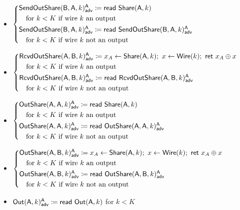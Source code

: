 \begin{itemize}
\item {\color{blue} $\begin{cases*} \LeakSendOutShare(\B,\A,k)^\A_\adv \coloneqq \read{\Share(\A,k)} \\ \hspace{10pt} \text{for $k < K$ if wire $k$ an output} \\ \LeakSendOutShare(\B,\A,k)^\A_\adv \coloneqq \read{\LeakSendOutShare(\B,\A,k)^\A_\adv} \\ \hspace{10pt} \text{for $k < K$ if wire $k$ not an output} \end{cases*}$}
\item {\color{blue} $\begin{cases*} \LeakRcvdOutShare(\A,\B,k)^\A_\adv \coloneqq x_A \leftarrow \Share(\A,k); \ x \leftarrow \Wire(k); \ \ret{x_A \oplus x} \\ \hspace{10pt} \text{for $k < K$ if wire $k$ an output} \\ \LeakRcvdOutShare(\A,\B,k)^\A_\adv \coloneqq \read{\LeakRcvdOutShare(\A,\B,k)^\A_\adv} \\ \hspace{10pt} \text{for $k < K$ if wire $k$ not an output} \end{cases*}$}
\item {\color{blue} $\begin{cases*} \LeakOutShare(\A,\A,k)^\A_\adv \coloneqq \read{\Share(\A,k)} \\ \hspace{10pt} \text{for $k < K$ if wire $k$ an output} \\ \LeakOutShare(\A,\A,k)^\A_\adv \coloneqq \read{\LeakOutShare(\A,\A,k)^\A_\adv} \\ \hspace{10pt} \text{for $k < K$ if wire $k$ not an output} \end{cases*}$}
\item {\color{blue} $\begin{cases*} \LeakOutShare(\A,\B,k)^\A_\adv \coloneqq x_A \leftarrow \Share(\A,k); \ x \leftarrow \Wire(k); \ \ret{x_A \oplus x} \\ \hspace{10pt} \text{for $k < K$ if wire $k$ an output} \\ \LeakOutShare(\A,\B,k)^\A_\adv \coloneqq \read{\LeakOutShare(\A,\B,k)^\A_\adv} \\ \hspace{10pt} \text{for $k < K$ if wire $k$ not an output} \end{cases*}$}
\item {\color{blue} $\mathsf{Out}(\mathsf{A},k)^{\mathsf{A}}_{\mathsf{adv}} \coloneqq \mathsf{read} \ \mathsf{Out}(\mathsf{A},k)$ for $k < K$}
\end{itemize}

